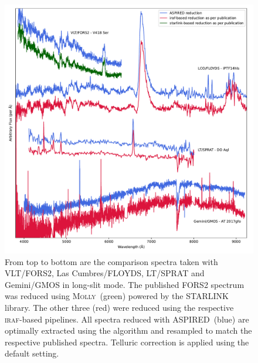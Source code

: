 \documentclass[linenumbers, twocolumn]{aastex631}
\begin{document}
\begin{figure}
    \centering
    \includegraphics[width=\textwidth]{fig_09_reduction_compared.pdf}
    \caption{From top to bottom are the comparison spectra taken with VLT/FORS2,
    Las Cumbres/FLOYDS, LT/SPRAT and Gemini/GMOS in long-slit mode. The published FORS2
    spectrum was reduced using \textsc{Molly}~(green) powered by the \textsc{STARLINK}
    library. The other three (red) were reduced using the respective \textsc{iraf}-based
    pipelines. All spectra reduced with \textsc{ASPIRED}~(blue) are optimally extracted using the \cite{1986PASP...98..609H} algorithm and resampled to match
    the respective published spectra. Telluric correction is applied using the default
    setting.}
    \label{fig:reduction_compared}
\end{figure}
\end{document}
